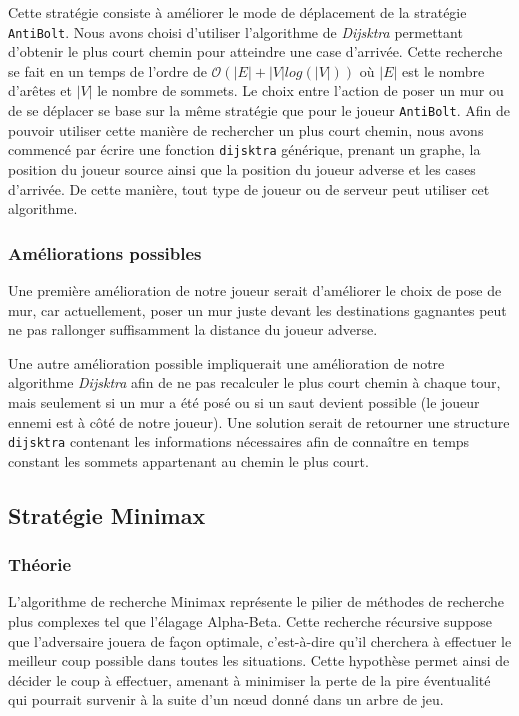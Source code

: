 \documentclass[11pt]{article}
\begin{document}
Cette stratégie consiste à améliorer le mode de déplacement de la stratégie \texttt{AntiBolt}. Nous avons choisi d'utiliser l'algorithme de \textit{Dijsktra} permettant d'obtenir le plus court chemin pour atteindre une case d'arrivée. Cette recherche se fait en un temps de l'ordre de $\mathcal{O}(|E|+|V|log(|V|))$ où $|E|$ est le nombre d'arêtes et $|V|$ le nombre de sommets. Le choix entre l'action de poser un mur ou de se déplacer se base sur la même stratégie que pour le joueur \texttt{AntiBolt}. Afin de pouvoir utiliser cette manière de rechercher un plus court chemin, nous avons commencé par écrire une fonction \texttt{dijsktra} générique, prenant un graphe, la position du joueur source ainsi que la position du joueur adverse et les cases d'arrivée. De cette manière, tout type de joueur ou de serveur peut utiliser cet algorithme.

\subsubsection{Améliorations possibles}

Une première amélioration de notre joueur serait d'améliorer le choix de pose de mur, car actuellement, poser un mur juste devant les destinations gagnantes peut ne pas rallonger suffisamment la distance du joueur adverse.

Une autre amélioration possible impliquerait une amélioration de notre algorithme \textit{Dijsktra} afin de ne pas recalculer le plus court chemin à chaque tour, mais seulement si un mur a été posé ou si un saut devient possible (le joueur ennemi est à côté de notre joueur). Une solution serait de retourner une structure \texttt{dijsktra} contenant les informations nécessaires afin de connaître en temps constant les sommets appartenant au chemin le plus court.


\subsection{Stratégie Minimax}

\subsubsection{Théorie}

L’algorithme de recherche Minimax \cite{Minimax} représente le pilier de méthodes de recherche plus complexes tel que l’élagage Alpha-Beta. Cette recherche récursive suppose que l’adversaire jouera de façon optimale, c’est-à-dire qu’il cherchera à effectuer le meilleur coup possible dans toutes les situations. Cette hypothèse  permet ainsi de décider le coup à effectuer, amenant à minimiser la perte de la pire éventualité qui pourrait survenir à la suite d’un nœud donné dans un arbre de jeu. 
\end{document}
